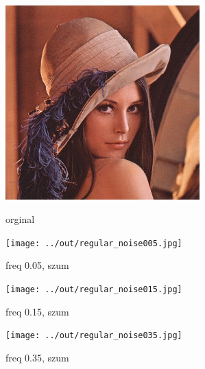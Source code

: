 \documentclass[a4paper,12pt]{article}
\begin{document}



\newpage
\begin{figure}[h!]
\begin{minipage}[t]{7.5cm}
\begin{center}
\includegraphics[width=7.5cm,clip]{../../lena.jpg}
\caption{orginal}
\end{center}
\end{minipage}
\hfill
\begin{minipage}[t]{7.5cm}
\begin{center}
\texttt{[image: ../out/regular\_noise005.jpg]}
\caption{freq 0.05, szum \protect}
\end{center}
\end{minipage}
\end{figure}

\begin{figure}[h!]
\begin{minipage}[t]{7.5cm}
\begin{center}
\texttt{[image: ../out/regular\_noise015.jpg]}
\caption{freq 0.15, szum \protect}
\end{center}
\end{minipage}
\hfill
\begin{minipage}[t]{7.5cm}
\begin{center}
\texttt{[image: ../out/regular\_noise035.jpg]}
\caption{freq 0.35, szum \protect}
\end{center}
\end{minipage}
\end{figure}
\end{document}
